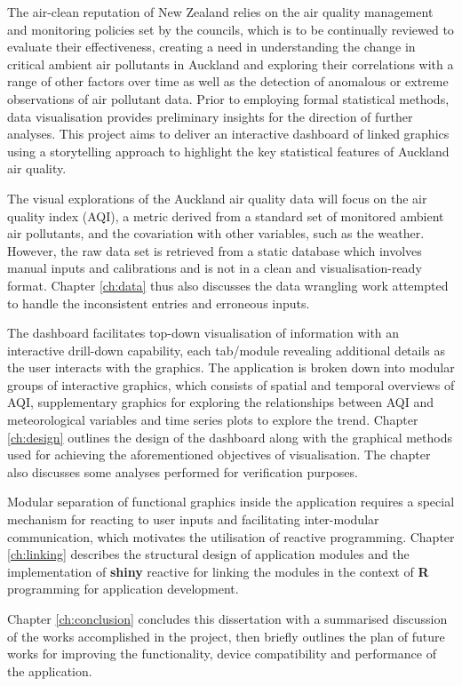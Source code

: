 \documentclass{aucklandthesis}
\begin{document}
The air-clean reputation of New Zealand relies on the air quality management and monitoring policies set by the councils, which is to be continually reviewed to evaluate their effectiveness, creating a need in understanding the change in critical ambient air pollutants in Auckland and exploring their correlations with a range of other factors over time as well as the detection of anomalous or extreme observations of air pollutant data. Prior to employing formal statistical methods, data visualisation provides preliminary insights for the direction of further analyses. This project aims to deliver an interactive dashboard of linked graphics using a storytelling approach to highlight the key statistical features of Auckland air quality.

The visual explorations of the Auckland air quality data will focus on the air quality index (AQI), a metric derived from a standard set of monitored ambient air pollutants, and the covariation with other variables, such as the weather. However, the raw data set is retrieved from a static database which involves manual inputs and calibrations and is not in a clean and visualisation-ready format. Chapter \ref{ch:data} thus also discusses the data wrangling work attempted to handle the inconsistent entries and erroneous inputs.

The dashboard facilitates top-down visualisation of information with an interactive drill-down capability, each tab/module revealing additional details as the user interacts with the graphics. The application is broken down into modular groups of interactive graphics, which consists of spatial and temporal overviews of AQI, supplementary graphics for exploring the relationships between AQI and meteorological variables and time series plots to explore the trend. Chapter \ref{ch:design} outlines the design of the dashboard along with the graphical methods used for achieving the aforementioned objectives of visualisation. The chapter also discusses some analyses performed for verification purposes.

Modular separation of functional graphics inside the application requires a special mechanism for reacting to user inputs and facilitating inter-modular communication, which motivates the utilisation of reactive programming. Chapter \ref{ch:linking} describes the structural design of application modules and the implementation of \textbf{shiny} reactive for linking the modules in the context of \textbf{R} programming for application development.

Chapter \ref{ch:conclusion} concludes this dissertation with a summarised discussion of the works accomplished in the project, then briefly outlines the plan of future works for improving the functionality, device compatibility and performance of the application.
\end{document}
